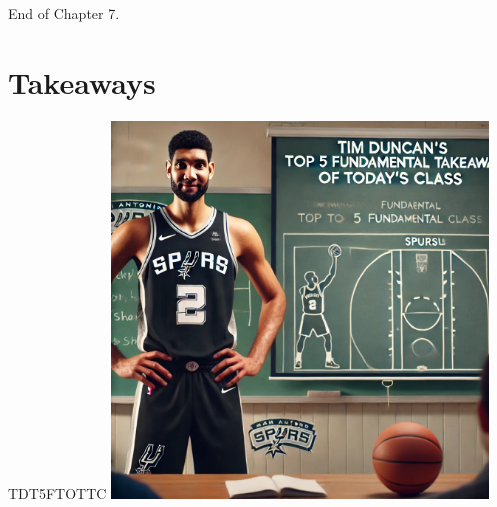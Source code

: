 \documentclass{beamer}
\begin{document}

\begin{frame}{}
     \centering
     \Huge End of Chapter 7.
\end{frame}

\section*{Takeaways}

\begin{frame}{TDT5FTOTTC}
    \centering
    \includegraphics[width=0.75\textwidth]{figures/tim.png}
\end{frame}
\end{document}
